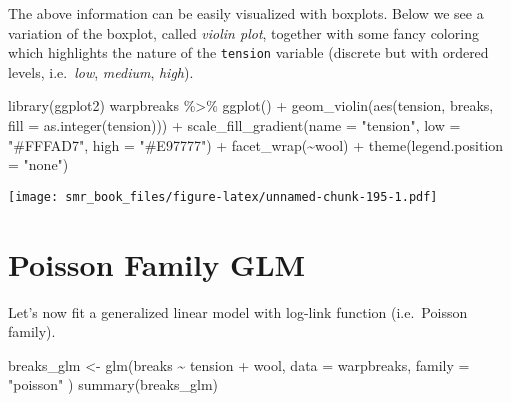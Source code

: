 \documentclass[
  oneside]{book}
\newenvironment{Shaded}{\begin{snugshade}}{\end{snugshade}}
\newcommand{\AttributeTok}[1]{\textcolor[rgb]{0.77,0.63,0.00}{#1}}
\newcommand{\FunctionTok}[1]{\textcolor[rgb]{0.00,0.00,0.00}{#1}}
\newcommand{\NormalTok}[1]{#1}
\newcommand{\OtherTok}[1]{\textcolor[rgb]{0.56,0.35,0.01}{#1}}
\newcommand{\SpecialCharTok}[1]{\textcolor[rgb]{0.00,0.00,0.00}{#1}}
\newcommand{\StringTok}[1]{\textcolor[rgb]{0.31,0.60,0.02}{#1}}
\begin{document}
The above information can be easily visualized with
boxplots. Below we see a variation of the boxplot, called
\emph{violin plot}, together with some fancy coloring which
highlights the nature of the \texttt{tension} variable (discrete
but with ordered levels, i.e.~\emph{low}, \emph{medium}, \emph{high}).

\begin{Shaded}
\begin{Highlighting}[]
\FunctionTok{library}\NormalTok{(ggplot2)}
\NormalTok{warpbreaks }\SpecialCharTok{\%\textgreater{}\%}
  \FunctionTok{ggplot}\NormalTok{() }\SpecialCharTok{+}
  \FunctionTok{geom\_violin}\NormalTok{(}\FunctionTok{aes}\NormalTok{(tension, breaks, }\AttributeTok{fill =} \FunctionTok{as.integer}\NormalTok{(tension))) }\SpecialCharTok{+}
  \FunctionTok{scale\_fill\_gradient}\NormalTok{(}\AttributeTok{name =} \StringTok{"tension"}\NormalTok{, }\AttributeTok{low =} \StringTok{"\#FFFAD7"}\NormalTok{, }\AttributeTok{high =} \StringTok{"\#E97777"}\NormalTok{) }\SpecialCharTok{+}
  \FunctionTok{facet\_wrap}\NormalTok{(}\SpecialCharTok{\textasciitilde{}}\NormalTok{wool) }\SpecialCharTok{+}
  \FunctionTok{theme}\NormalTok{(}\AttributeTok{legend.position =} \StringTok{"none"}\NormalTok{)}
\end{Highlighting}
\end{Shaded}

\texttt{[image: smr\_book\_files/figure-latex/unnamed-chunk-195-1.pdf]}

\hypertarget{poisson-family-glm}{%
\section{Poisson Family GLM}\label{poisson-family-glm}}

Let's now fit a generalized linear model with log-link function
(i.e.~Poisson family).

\begin{Shaded}
\begin{Highlighting}[]
\NormalTok{breaks\_glm }\OtherTok{\textless{}{-}} \FunctionTok{glm}\NormalTok{(breaks }\SpecialCharTok{\textasciitilde{}}\NormalTok{ tension }\SpecialCharTok{+}\NormalTok{ wool,}
  \AttributeTok{data =}\NormalTok{ warpbreaks,}
  \AttributeTok{family =} \StringTok{"poisson"}
\NormalTok{)}
\FunctionTok{summary}\NormalTok{(breaks\_glm)}
\end{Highlighting}
\end{Shaded}
\end{document}
